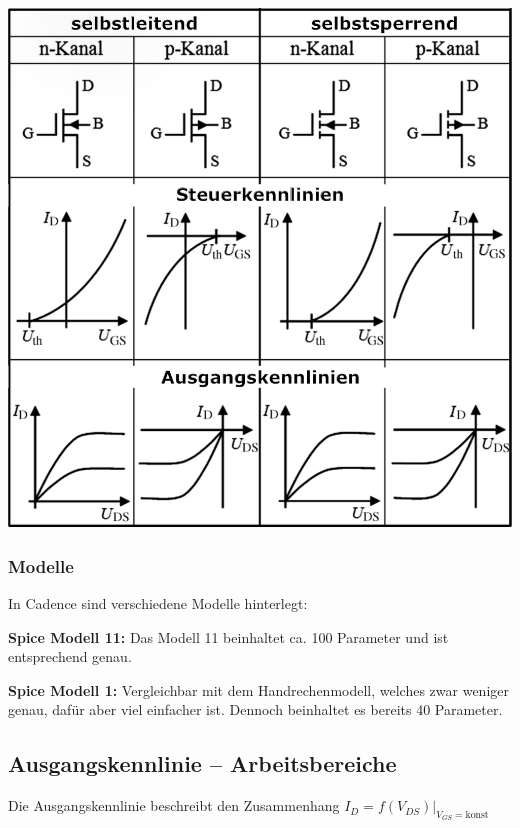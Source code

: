 \begin{minipage}[t]{0.5\columnwidth}
    \includegraphics[width=\columnwidth, align=t]{images/MOSFET_uebersicht.pdf}
\end{minipage}



\subsubsection{Modelle}
In Cadence sind verschiedene Modelle hinterlegt:

\textbf{Spice Modell 11:} Das Modell 11 beinhaltet ca. 100 Parameter und ist entsprechend genau.

\textbf{Spice Modell 1:} Vergleichbar mit dem Handrechenmodell, welches zwar weniger genau, dafür aber viel einfacher ist. Dennoch beinhaltet es bereits 40 Parameter.

\subsection{Ausgangskennlinie -- Arbeitsbereiche}
 
Die Ausgangskennlinie beschreibt den Zusammenhang $I_D = f(V_{DS}) \big|_{V_{GS} = \text{konst}}$

